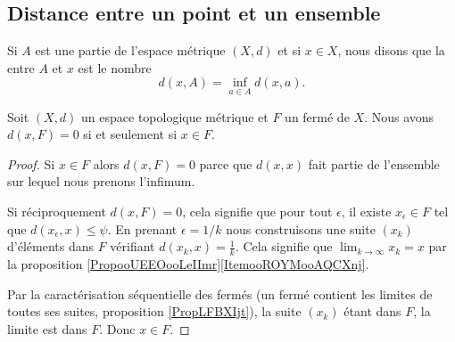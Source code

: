 \subsection{Distance entre un point et un ensemble}

\begin{definition}
	Si $A$ est une partie de l'espace métrique $(X,d)$ et si $x\in X$, nous disons que la  entre $A$ et $x$ est le nombre
	\begin{equation}		\label{EqdefDistaA}
		d(x,A)=\inf_{a\in A}d(x,a).
	\end{equation}
\end{definition}
\newcommand{\CaptionFigDistanceEnsemble}{La distance entre $x$ et $A$ est donnée par la distance entre $x$ et $p$. Les distances entre $x$ et les autres points de $A$ sont plus grandes que $d(x,p)$.}


\begin{proposition}     \label{PropGULUooNzqZKj}
    Soit \( (X,d) \) un espace topologique métrique et \( F\) un fermé de \( X\). Nous avons \( d(x,F)=0\) si et seulement si \( x\in F\).
\end{proposition}

\begin{proof}
    Si \( x\in F\) alors \( d(x,F)=0\) parce que \( d(x,x)\) fait partie de l'ensemble sur lequel nous prenons l'infimum.

    Si réciproquement \( d(x,F)=0\), cela signifie que pour tout \( \epsilon\), il existe \( x_{\epsilon}\in F\) tel que \( d(x_{\epsilon},x)\leq \psi\). En prenant \(\epsilon=1/k\) nous construisons une suite \( (x_k)\) d'éléments dans \( F\) vérifiant \( d(x_k,x)=\frac{1}{ k }\). Cela signifie que \( \lim_{k\to \infty} x_k=x\) par la proposition \ref{PropooUEEOooLeIImr}\ref{ItemooROYMooAQCXnj}.

    Par la caractérisation séquentielle des fermés (un fermé contient les limites de toutes ses suites, proposition \ref{PropLFBXIjt}), la suite \( (x_k)\) étant dans \( F\), la limite est dans \( F\). Donc \( x\in F\).
\end{proof}


